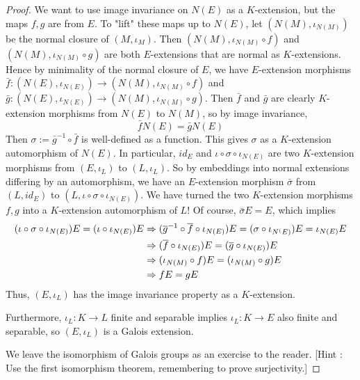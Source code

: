 \documentclass[../book.tex]{subfiles}
\begin{document}
\begin{proof}
        We want to use image invariance on $N(E)$ as a $K$-extension,
        but the maps $f, g$ are from $E$. 
        To "lift" these maps up to $N(E)$, 
        let $(N(M),\iota_{N(M)})$ be the normal closure of $(M,\iota_M)$. 
        Then $(N(M),\iota_{N(M)}\circ f)$ and $(N(M),\iota_{N(M)}\circ g)$
        are both $E$-extensions that are normal as $K$-extensions.
        Hence by minimality of the normal closure of $E$, 
        we have $E$-extension morphisms 
        $\bar{f} : (N(E),\iota_{N(E)}) \to (N(M),\iota_{N(M)}\circ f)$
        and $\bar{g} : (N(E),\iota_{N(E)}) \to (N(M),\iota_{N(M)}\circ g)$.
        Then $\bar{f}$ and $\bar{g}$ are clearly $K$-extension morphisms
        from $N(E)$ to $N(M)$,
        so by image invariance, \[ \bar{f} N(E) = \bar{g} N(E) \]
        Then $\sigma := \bar{g}^{-1} \circ \bar{f}$ is well-defined as a function.
        This gives $\sigma$ as a $K$-extension automorphism of $N(E)$. 
        In particular, $id_E$ and $\iota\circ\sigma\circ\iota_{N(E)}$ 
        are two $K$-extension morphisms from $(E,\iota_L)$ to $(L,\iota_L)$.
        So by embeddings into normal extensions differing by an automorphism, 
        we have an $E$-extension morphism $\bar{\sigma}$
        from $(L,id_E)$ to $(L,\iota\circ\sigma\circ\iota_{N(E)})$.
        We have turned the two $K$-extension morphisms $f, g$ into 
        a $K$-extension automorphism of $L$!
        Of course, $\bar{\sigma} E = E$, which implies \begin{align*}
            (\iota\circ\sigma\circ\iota_{N(E)}) E = (\iota\circ\iota_{N(E)}) E &\Rightarrow
            (\overline{g}^{-1}\circ\overline{f}\circ\iota_{N(E)}) E 
            = (\sigma\circ\iota_{N^(E)})E = \iota_{N(E)} E \\
            &\Rightarrow (\overline{f}\circ\iota_{N(E)}) E = (\overline{g}\circ\iota_{N(E)}) E \\
            &\Rightarrow (\iota_{N(M)}\circ f) E = (\iota_{N(M)}\circ g) E \\
            &\Rightarrow f E = g E
        \end{align*}
        Thus, $(E,\iota_L)$ has the image invariance property as a $K$-extension. 
        
        Furthermore, $\iota_L : K \to L$ finite and separable implies 
        $\iota_L : K \to E$ also finite and separable,
        so $(E,\iota_L)$ is a Galois extension. 
        
        We leave the isomorphism of Galois groups as an exercise to the reader. 
        [Hint : Use the first isomorphism theorem, remembering to prove surjectivity.]
\end{proof}
\end{document}
